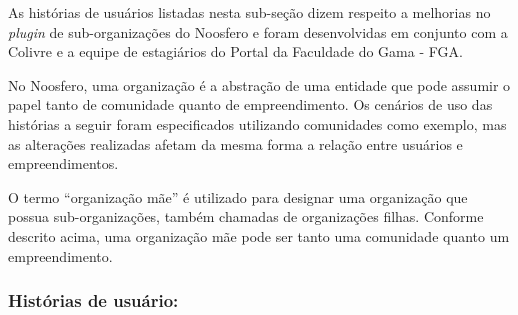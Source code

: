 As histórias de usuários listadas nesta sub-seção dizem respeito a melhorias
no \textit{plugin} de sub-organizações do Noosfero e foram desenvolvidas em
conjunto com a Colivre e a equipe de estagiários do Portal da Faculdade do
Gama - FGA.

No Noosfero, uma organização é a abstração de uma entidade que pode assumir
o papel tanto de comunidade quanto de empreendimento. Os cenários de uso das
histórias a seguir foram especificados utilizando comunidades como exemplo,
mas as alterações realizadas afetam da mesma forma a relação entre usuários
e empreendimentos.


O termo ``organização mãe'' é utilizado para designar uma organização que
possua sub-organizações, também chamadas de organizações filhas. Conforme
descrito acima, uma organização mãe pode ser tanto uma comunidade quanto um
empreendimento.

\subsubsection*{Histórias de usuário:}

